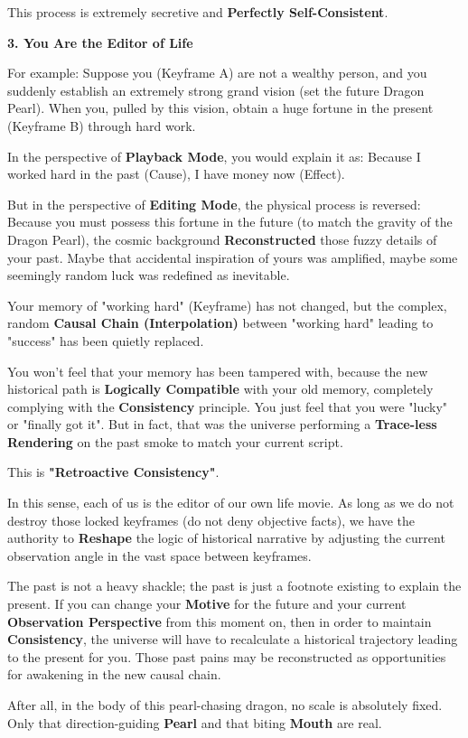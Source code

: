 This process is extremely secretive and \textbf{Perfectly Self-Consistent}.

\textbf{3. You Are the Editor of Life}

For example: Suppose you (Keyframe A) are not a wealthy person, and you suddenly establish an extremely strong grand vision (set the future Dragon Pearl). When you, pulled by this vision, obtain a huge fortune in the present (Keyframe B) through hard work.

In the perspective of \textbf{Playback Mode}, you would explain it as: Because I worked hard in the past (Cause), I have money now (Effect).

But in the perspective of \textbf{Editing Mode}, the physical process is reversed: Because you must possess this fortune in the future (to match the gravity of the Dragon Pearl), the cosmic background \textbf{Reconstructed} those fuzzy details of your past. Maybe that accidental inspiration of yours was amplified, maybe some seemingly random luck was redefined as inevitable.

Your memory of "working hard" (Keyframe) has not changed, but the complex, random \textbf{Causal Chain (Interpolation)} between "working hard" leading to "success" has been quietly replaced.

You won't feel that your memory has been tampered with, because the new historical path is \textbf{Logically Compatible} with your old memory, completely complying with the \textbf{Consistency} principle. You just feel that you were "lucky" or "finally got it". But in fact, that was the universe performing a \textbf{Trace-less Rendering} on the past smoke to match your current script.

This is \textbf{"Retroactive Consistency"}.

In this sense, each of us is the editor of our own life movie. As long as we do not destroy those locked keyframes (do not deny objective facts), we have the authority to \textbf{Reshape} the logic of historical narrative by adjusting the current observation angle in the vast space between keyframes.

The past is not a heavy shackle; the past is just a footnote existing to explain the present. If you can change your \textbf{Motive} for the future and your current \textbf{Observation Perspective} from this moment on, then in order to maintain \textbf{Consistency}, the universe will have to recalculate a historical trajectory leading to the present for you. Those past pains may be reconstructed as opportunities for awakening in the new causal chain.

After all, in the body of this pearl-chasing dragon, no scale is absolutely fixed. Only that direction-guiding \textbf{Pearl} and that biting \textbf{Mouth} are real.

